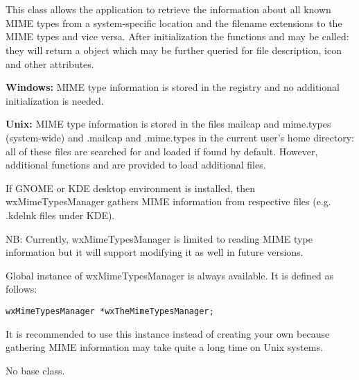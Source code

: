 \section{}\label{wxmimetypesmanager}

This class allows the application to retrieve the information about all known
MIME types from a system-specific location and the filename extensions to the
MIME types and vice versa. After initialization the functions
and  
may be called: they will return a  object which
may be further queried for file description, icon and other attributes.

{\bf Windows:} MIME type information is stored in the registry and no additional
initialization is needed.

{\bf Unix:} MIME type information is stored in the files mailcap and mime.types
(system-wide) and .mailcap and .mime.types in the current user's home directory:
all of these files are searched for and loaded if found by default. However,
additional functions 
 and 
 are
provided to load additional files.

If GNOME or KDE desktop environment is installed, then wxMimeTypesManager 
gathers MIME information from respective files (e.g. .kdelnk files under KDE).

NB: Currently, wxMimeTypesManager is limited to reading MIME type information
but it will support modifying it as well in future versions.


Global instance of wxMimeTypesManager is always available. It is defined
as follows:

\begin{verbatim}
wxMimeTypesManager *wxTheMimeTypesManager;
\end{verbatim}

It is recommended to use this instance instead of creating your own because
gathering MIME information may take quite a long time on Unix systems.


No base class.


